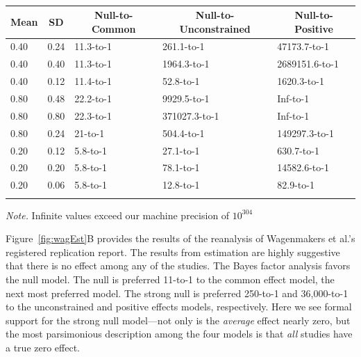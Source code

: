 \documentclass[english,man]{apa6}
\theoremstyle{definition}
\theoremstyle{definition}
\theoremstyle{remark}
\begin{document}
\begin{table}[tbp]
\begin{center}
\begin{threeparttable}
\caption{\label{tab:sens}}
\begin{tabular}{lllll}
\toprule
Mean & \multicolumn{1}{c}{SD} & \multicolumn{1}{c}{Null-to-Common} & \multicolumn{1}{c}{Null-to-Unconstrained} & \multicolumn{1}{c}{Null-to-Positive}\\
\midrule
0.40 & 0.24 & 11.3-to-1 & 261.1-to-1 & 47173.7-to-1\\
0.40 & 0.40 & 11.3-to-1 & 1964.3-to-1 & 2689151.6-to-1\\
0.40 & 0.12 & 11.4-to-1 & 52.8-to-1 & 1620.3-to-1\\
0.80 & 0.48 & 22.2-to-1 & 9929.5-to-1 & Inf-to-1\\
0.80 & 0.80 & 22.3-to-1 & 371027.3-to-1 & Inf-to-1\\
0.80 & 0.24 & 21-to-1 & 504.4-to-1 & 149297.3-to-1\\
0.20 & 0.12 & 5.8-to-1 & 27.1-to-1 & 630.7-to-1\\
0.20 & 0.20 & 5.8-to-1 & 78.1-to-1 & 14582.6-to-1\\
0.20 & 0.06 & 5.8-to-1 & 12.8-to-1 & 82.9-to-1\\
\bottomrule
\addlinespace
\end{tabular}
\begin{tablenotes}[para]
\textit{Note.} Infinite values exceed our machine precision of $10^304$
\end{tablenotes}
\end{threeparttable}
\end{center}
\end{table}

Figure~\ref{fig:wagEst}B provides the results of the reanalysis of
Wagenmakers et al.'s registered replication report. The results from
estimation are highly suggestive that there is no effect among any of
the studies. The Bayes factor analysis favors the null model. The null
is preferred 11-to-1 to the common effect model, the next most preferred
model. The strong null is preferred 250-to-1 and 36,000-to-1 to the
unconstrained and positive effects models, respectively. Here we see
formal support for the strong null model---not only is the
\emph{average} effect nearly zero, but the most parsimonious description
among the four models is that \emph{all} studies have a true zero
effect.
\end{document}

